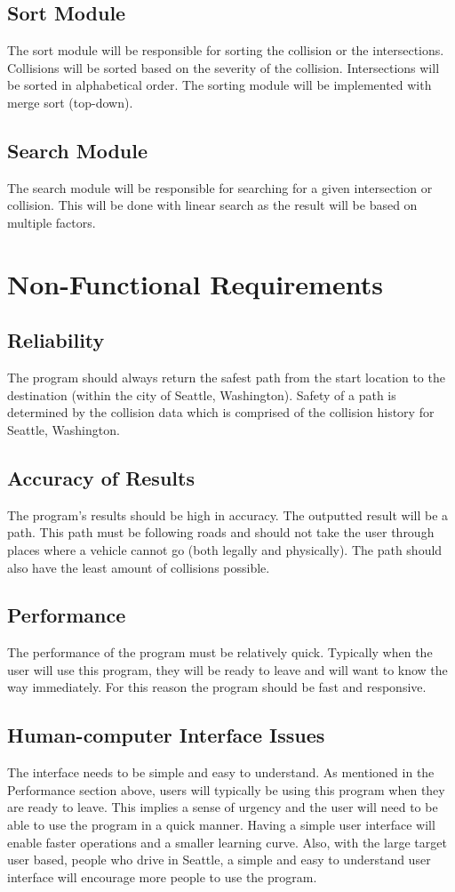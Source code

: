 \documentclass[12pt]{article}
\begin{document}
\subsection{Sort Module}
The sort module will be responsible for sorting the collision or the intersections. Collisions will be sorted based on the severity of the collision. Intersections will be sorted in alphabetical order. The sorting module will be implemented with merge sort (top-down).

\subsection{Search Module}
The search module will be responsible for searching for a given intersection or collision. This will be done with linear search as the result will be based on multiple factors.

\section{Non-Functional Requirements}
\subsection{Reliability}
The program should always return the safest path from the start location to the destination (within the city of Seattle, Washington). Safety of a path is determined by the collision data which is comprised of the collision history for Seattle, Washington.

\subsection{Accuracy of Results}
The program's results should be high in accuracy. The outputted result will be a path. This path must be following roads and should not take the user through places where a vehicle cannot go (both legally and physically). The path should also have the least amount of collisions possible.

\subsection{Performance}
The performance of the program must be relatively quick. Typically when the user will use this program, they will be ready to leave and will want to know the way immediately. For this reason the program should be fast and responsive.

\subsection{Human-computer Interface Issues}
The interface needs to be simple and easy to understand. As mentioned in the Performance section above, users will typically be using this program when they are ready to leave. This implies a sense of urgency and the user will need to be able to use the program in a quick manner. Having a simple user interface will enable faster operations and a smaller learning curve. Also, with the large target user based, people who drive in Seattle, a simple and easy to understand user interface will encourage more people to use the program.
\end{document}
